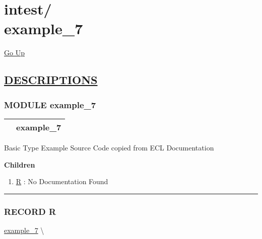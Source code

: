 \chapter*{\color{headfile}
{\large intest\slash\hspace{0pt}}
 \\
example_7
}
\hypertarget{ecldoc:toc:intest.example_7}{}
\hyperlink{ecldoc:toc:root/intest}{Go Up}


\section*{\underline{\textsf{DESCRIPTIONS}}}
\subsection*{\textsf{\colorbox{headtoc}{\color{white} MODULE}
example\_7}}

\hypertarget{ecldoc:intest.example_7}{}

{\renewcommand{\arraystretch}{1.5}
\begin{tabularx}{\textwidth}{|>{\raggedright\arraybackslash}l|X|}
\hline
\hspace{0pt}\mytexttt{\color{red} } & \textbf{example\_7} \\
\hline
\end{tabularx}
}

\par





Basic Type Example Source Code copied from ECL Documentation







\textbf{Children}
\begin{enumerate}
\item \hyperlink{ecldoc:intest.example_7.r}{R}
: No Documentation Found
\end{enumerate}

\rule{\linewidth}{0.5pt}

\subsection*{\textsf{\colorbox{headtoc}{\color{white} RECORD}
R}}

\hypertarget{ecldoc:intest.example_7.r}{}
\hspace{0pt} \hyperlink{ecldoc:intest.example_7}{example_7} \textbackslash 


